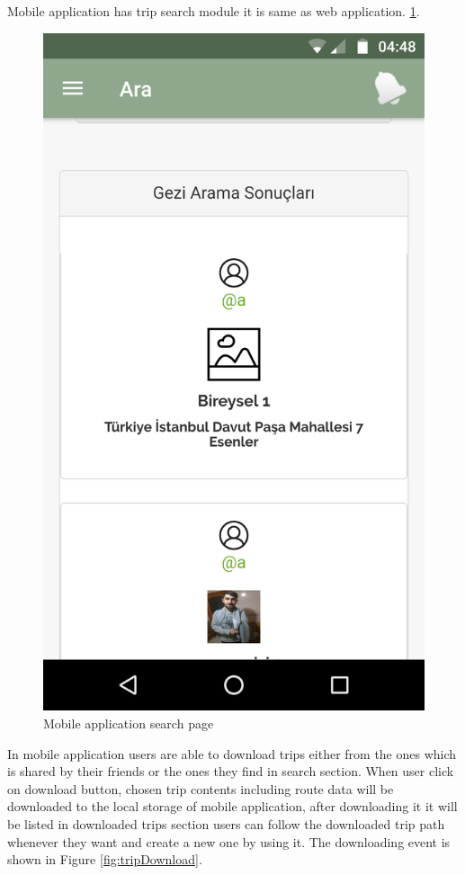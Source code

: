 \newpage

Mobile application has trip search module it is same as web application.
\ref{fig:mobilGeziArama}.

\begin{figure}[!htbp]
\centering
\includegraphics[scale=0.09]{projectChapters/images/mobilGeziArama.png}
\caption{Mobile application search page}
\label{fig:mobilGeziArama}
\end{figure}

In mobile application users are able to download trips either from the ones which is shared by their friends or the ones they find in search section. When user click on download button, chosen trip contents including route data will be downloaded to the local storage of mobile application, after downloading it it will be listed in downloaded trips section users can follow the downloaded trip path whenever they want and create a new one by using it. The downloading event is shown in Figure 
\ref{fig:tripDownload}.

